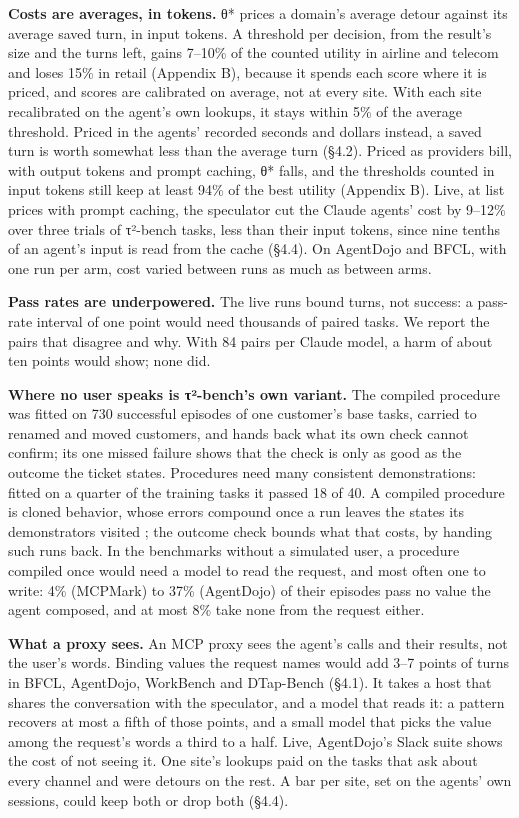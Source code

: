\documentclass[10pt,twocolumn,letterpaper]{article}
\newcommand{\runin}[1]{{\sffamily\bfseries\color{accent}#1}}
\begin{document}
\runin{Costs are averages, in tokens.} θ* prices a domain's average detour against its average saved turn, in input tokens. A threshold per decision, from the result's size and the turns left, gains 7--10\% of the counted utility in airline and telecom and loses 15\% in retail (Appendix B), because it spends each score where it is priced, and scores are calibrated on average, not at every site. With each site recalibrated on the agent's own lookups, it stays within 5\% of the average threshold. Priced in the agents' recorded seconds and dollars instead, a saved turn is worth somewhat less than the average turn (§4.2). Priced as providers bill, with output tokens and prompt caching, θ* falls, and the thresholds counted in input tokens still keep at least 94\% of the best utility (Appendix B). Live, at list prices with prompt caching, the speculator cut the Claude agents' cost by 9--12\% over three trials of τ²-bench tasks, less than their input tokens, since nine tenths of an agent's input is read from the cache (§4.4). On AgentDojo and BFCL, with one run per arm, cost varied between runs as much as between arms.

\runin{Pass rates are underpowered.} The live runs bound turns, not success: a pass-rate interval of one point would need thousands of paired tasks. We report the pairs that disagree and why. With 84 pairs per Claude model, a harm of about ten points would show; none did.

\runin{Where no user speaks is τ²-bench's own variant.} The compiled procedure was fitted on 730 successful episodes of one customer's base tasks, carried to renamed and moved customers, and hands back what its own check cannot confirm; its one missed failure shows that the check is only as good as the outcome the ticket states. Procedures need many consistent demonstrations: fitted on a quarter of the training tasks it passed 18 of 40. A compiled procedure is cloned behavior, whose errors compound once a run leaves the states its demonstrators visited \citep{ross2011dagger}; the outcome check bounds what that costs, by handing such runs back. In the benchmarks without a simulated user, a procedure compiled once would need a model to read the request, and most often one to write: 4\% (MCPMark) to 37\% (AgentDojo) of their episodes pass no value the agent composed, and at most 8\% take none from the request either.

\runin{What a proxy sees.} An MCP proxy sees the agent's calls and their results, not the user's words. Binding values the request names would add 3--7 points of turns in BFCL, AgentDojo, WorkBench and DTap-Bench (§4.1). It takes a host that shares the conversation with the speculator, and a model that reads it: a pattern recovers at most a fifth of those points, and a small model that picks the value among the request's words a third to a half. Live, AgentDojo's Slack suite shows the cost of not seeing it. One site's lookups paid on the tasks that ask about every channel and were detours on the rest. A bar per site, set on the agents' own sessions, could keep both or drop both (§4.4).
\end{document}
